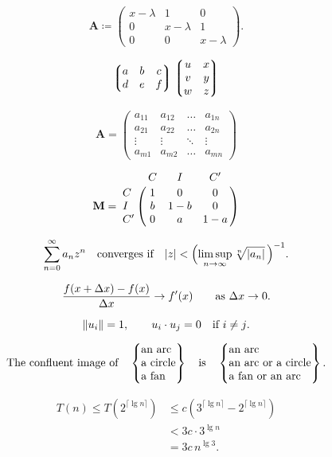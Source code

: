 \documentclass[12pt, a4paper, oneside]{article}
\newcommand{\mathup}[1]{\mathrm{#1}}
\theoremstyle{Plain}
\theoremstyle{Definition}
\theoremstyle{Remark}
\begin{document}
\begin{appendix}

$$\mathbf{A} \coloneq \begin{pmatrix}x-\lambda&1&0\\
0&x-\lambda&1\\
0&0&x-\lambda\end{pmatrix}.$$

$$\left\lgroup\begin{matrix}a&b&c\\ d&e&f\\\end{matrix}\right\rgroup
\left\lgroup\begin{matrix}u&x\cr v&y\cr w&z\end{matrix}\right\rgroup$$


$$\mathbf{A} = \begin{pmatrix}a_{11}&a_{12}&\ldots&a_{1n}\\
a_{21}&a_{22}&\ldots&a_{2n}\\
\vdots&\vdots&\ddots&\vdots\\
a_{m1}&a_{m2}&\ldots&a_{mn}\end{pmatrix}$$

$$\mathbf{M}=\bordermatrix{&C&I&C'\cr
	C&1&0&0\cr I&b&1-b&0\cr C'&0&a&1-a}$$


$$\sum_{n=0}^\infty a_nz^n\quad\hbox{converges if}\quad
|z|<\Bigl(\limsup_{n\to\infty}\root n\of{|a_n|}\,\Bigr)^{-1}.$$

$$\frac{f(x+\mathup{\Delta} x)-f(x)}{\mathup{\Delta} x}\to f'(x)
\qquad \hbox{as $\mathup{\Delta} x\to0$.}$$

$$\|u_i\|=1,\qquad u_i\cdot u_j=0\quad\hbox{if $i\ne j$.}$$


$$\hbox{The confluent image of}\quad
\begin{Bmatrix}\hbox{an arc}\hfill\\%
\hbox{a circle}\hfill\\%
\hbox{a fan}\hfill\end{Bmatrix}
\quad\hbox{is}\quad
\begin{Bmatrix}\hbox{an arc}\hfill\\%
\hbox{an arc or a circle}\hfill\\%
\hbox{a fan or an arc}\hfill\end{Bmatrix}.$$


\begin{align*}
T(n)\le T(2^{\lceil\lg n\rceil})
&\le c(3^{\lceil\lg n\rceil}-2^{\lceil\lg n\rceil})\\
&<3c\cdot3^{\lg n}\\
&=3c\,n^{\lg3}.
\end{align*}


\end{appendix}
\end{document}
